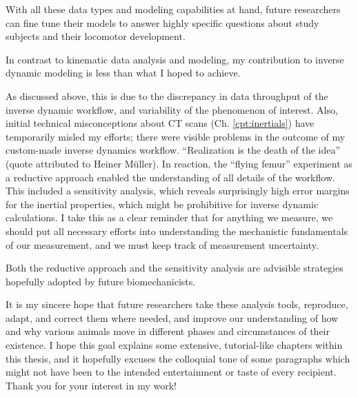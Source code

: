 With all these data types and modeling capabilities at hand, future researchers can fine tune their models to answer highly specific questions about study subjects and their locomotor development.


In contrast to kinematic data analysis and modeling, my contribution to inverse dynamic modeling is less than what I hoped to achieve.

As discussed above, this is due to the discrepancy in data throughput of the inverse dynamic workflow, and variability of the phenomenon of interest.
Also, initial technical misconceptions about CT scans (Ch. \ref{cpt:inertials}) have temporarily misled my efforts; there were visible problems in the outcome of my custom-made inverse dynamics workflow.
``Realization is the death of the idea'' (quote attributed to Heiner Müller).
In reaction, the ``flying femur'' experiment as a reductive approach enabled the understanding of all details of the workflow.
This included a sensitivity analysis, which reveals surprisingly high error margins for the inertial properties, which might be prohibitive for inverse dynamic calculations.
I take this as a clear reminder that for anything we measure, we should put all necessary efforts into understanding the mechanistic fundamentals of our measurement, and we must keep track of measurement uncertainty.

Both the reductive approach and the sensitivity analysis are advisible strategies hopefully adopted by future biomechanicists.


It is my sincere hope that future researchers take these analysis tools, reproduce, adapt, and correct them where needed, and improve our understanding of how and why various animals move in different phases and circumstances of their existence.
I hope this goal explains some extensive, tutorial-like chapters within this thesis, and it hopefully excuses the colloquial tone of some paragraphs which might not have been to the intended entertainment or taste of every recipient.
\bigskip
Thank you for your interest in my work!
